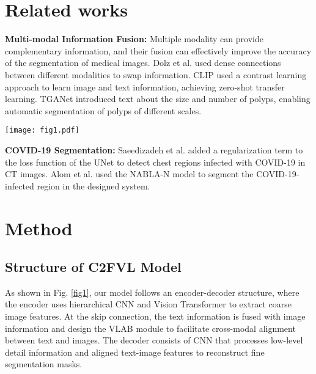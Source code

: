 \documentclass{article}
\begin{document}
\section{Related works}
\vspace{-2mm}
\label{sec:relatedworks}
\textbf{Multi-modal Information Fusion:} 
Multiple modality can provide complementary information, and their fusion can effectively improve the accuracy of the segmentation of medical images. Dolz et al. \cite{dolz2018hyperdense} used dense connections between different modalities to swap information.
CLIP \cite{radford2021learning} used a contrast learning approach to learn image and text information, achieving zero-shot transfer learning.  TGANet \cite{tomar2022tganet} introduced text about the size and number of polyps, enabling automatic segmentation of polyps of different scales.
\setlength{\belowcaptionskip}{0pt}
\setlength{\abovecaptionskip}{0pt}
\begin{figure*}[!ht]
    \centering
	\centerline{\texttt{[image: fig1.pdf]}}
	\caption{Overview of the C2FVL framework. It consists of three parts, encoder, VLAB branch and decoder.}
	\label{fig1}
	\vspace{-2mm}
\end{figure*}

\noindent\textbf{COVID-19 Segmentation:} 
Saeedizadeh et al. \cite{saeedizadeh2021covid} added a regularization term to the loss function of the UNet to detect chest regions infected with COVID-19 in CT images. 
Alom et al. \cite{alom2020covid_mtnet} used the NABLA-N model to segment the COVID-19-infected region in the designed system. 

\vspace{-3mm}
\section{Method}
\label{sec:method}
\vspace{-2mm}
\subsection{Structure of C2FVL Model}
\vspace{-1mm}
As shown in Fig. \ref{fig1}, our model follows an encoder-decoder structure, where the encoder uses hierarchical CNN and Vision Transformer to extract coarse image features. At the skip connection, the text information is fused with image information and design the VLAB module to facilitate cross-modal alignment between text and images. The decoder consists of CNN that processes low-level detail information and aligned text-image features to reconstruct fine segmentation masks.
\end{document}
